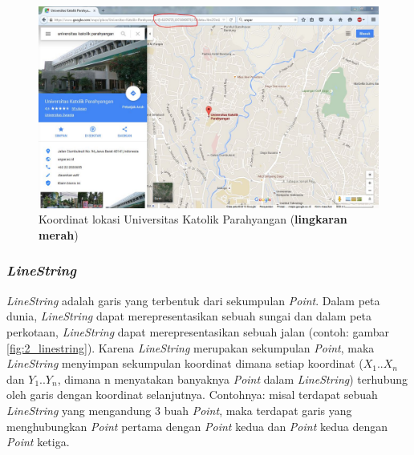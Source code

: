 \begin{figure}[htbp]
	\centering
		\includegraphics[scale=0.4]{Gambar/2_UNPAR.JPG}
	\caption{Koordinat lokasi Universitas Katolik Parahyangan (\textbf{lingkaran merah})}
	\label{fig:2_UNPAR}
\end{figure}

\subsubsection{\textit{LineString}}
\label{sec:linestring}
\textit{LineString} adalah garis yang terbentuk dari sekumpulan \textit{Point}\cite{spatialtipedatalinestring}. Dalam peta dunia, \textit{LineString} dapat merepresentasikan sebuah sungai dan dalam peta perkotaan, \textit{LineString} dapat merepresentasikan sebuah jalan (contoh: gambar \ref{fig:2_linestring}). Karena \textit{LineString} merupakan sekumpulan \textit{Point}, maka \textit{LineString} menyimpan sekumpulan koordinat dimana setiap koordinat ($X_{1}$..$X_{n}$ dan $Y_{1}$..$Y_{n}$, dimana n menyatakan banyaknya \textit{Point} dalam \textit{LineString}) terhubung oleh garis dengan koordinat selanjutnya. Contohnya: misal terdapat sebuah \textit{LineString} yang mengandung 3 buah \textit{Point}, maka terdapat garis yang menghubungkan \textit{Point} pertama dengan \textit{Point} kedua dan \textit{Point} kedua dengan \textit{Point} ketiga.

